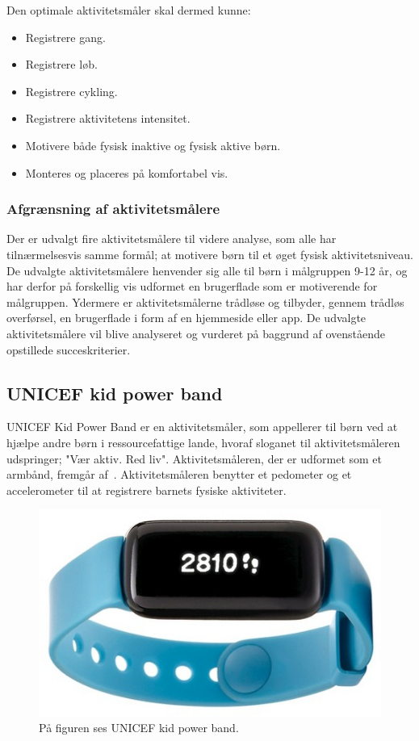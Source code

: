 Den optimale aktivitetsmåler skal dermed kunne: 
\begin{itemize}
\item Registrere gang.
\item Registrere løb.
\item Registrere cykling.
\item Registrere aktivitetens intensitet. %
\item Motivere både fysisk inaktive og fysisk aktive børn. %
\item Monteres og placeres på komfortabel vis.
\end{itemize}

\subsubsection{Afgrænsning af aktivitetsmålere}  %
Der er udvalgt fire aktivitetsmålere til videre analyse, som alle har tilnærmelsesvis samme formål; at motivere børn til et øget fysisk aktivitetsniveau. De udvalgte aktivitetsmålere henvender sig alle til børn i målgruppen 9-12 år, og har derfor på forskellig vis udformet en brugerflade som er motiverende for målgruppen. Ydermere er aktivitetsmålerne trådløse og tilbyder, gennem trådløs overførsel, en brugerflade i form af en hjemmeside eller app. \newline
De udvalgte aktivitetsmålere vil blive analyseret og vurderet på baggrund af ovenstående opstillede succeskriterier.

\subsection{UNICEF kid power band}
UNICEF Kid Power Band er en aktivitetsmåler, som appellerer til børn ved at hjælpe andre børn i ressourcefattige lande, hvoraf sloganet til aktivitetsmåleren udspringer; "Vær aktiv. Red liv". \newline
Aktivitetsmåleren, der er udformet som et armbånd, fremgår af~. Aktivitetsmåleren benytter et pedometer og et accelerometer til at registrere barnets fysiske aktiviteter. \citep{PowerAbout2015,PowerManual2015}

\begin{figure}[H]
	\centering
	\includegraphics[scale=0.6]{figures/aProblemanalyse/unicef.png}
	\caption{På figuren ses UNICEF kid power band. \cite{Unicef2016}}
	\label{fig:unicef}
\end{figure}


